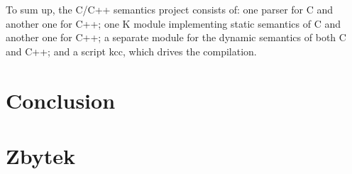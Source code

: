 \documentclass{fithesis3}
\begin{document}
To sum up, the C/C++ semantics project consists of: one parser for C and another one for C++; one K module implementing static semantics of C and another one for C++; a separate module for the dynamic semantics of both C and C++; and a script kcc, which drives the compilation.










\chapter{Conclusion}
	
\chapter{Zbytek}
\end{document}

